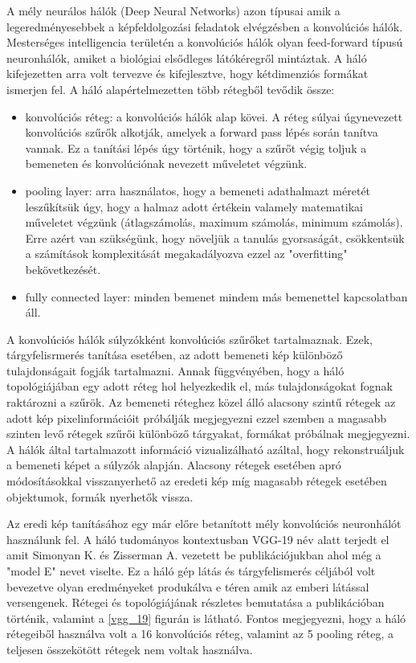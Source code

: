 \documentclass[12pt, a4paper, oneside]{book}
\theoremstyle{tetel}
\begin{document}
A mély neurálos hálók (Deep Neural Networks) azon típusai amik a legeredményesebbek a képfeldolgozási feladatok elvégzésben a konvolúciós hálók. Mesterséges intelligencia területén a konvolúciós hálók olyan feed-forward típusú neuronhálók, amiket a biológiai elsődleges látókéregről mintáztak. A háló kifejezetten arra volt tervezve és kifejlesztve, hogy kétdimenziós formákat ismerjen fel. A háló alapértelmezetten több rétegből tevődik össze:

\begin{itemize}
	\item konvolúciós réteg: a konvolúciós hálók alap kövei. A réteg súlyai úgynevezett konvolúciós szűrők alkotják, amelyek a forward pass lépés során tanítva vannak. Ez a tanítási lépés úgy történik, hogy a szűrőt végig toljuk a bemeneten és konvolúciónak nevezett műveletet végzünk. 
	\item pooling layer: arra használatos, hogy a bemeneti adathalmazt méretét leszűkítsük úgy, hogy a halmaz adott értékein valamely matematikai műveletet végzünk (átlagszámolás, maximum számolás, minimum számolás). Erre azért van szükségünk, hogy növeljük a tanulás gyorsaságát, csökkentsük a számítások komplexitását megakadályozva ezzel az "overfitting" bekövetkezését.
	\item fully connected layer: minden bemenet mindem más bemenettel kapcsolatban áll.
\end{itemize}

A konvolúciós hálók súlyzókként konvolúciós szűrőket tartalmaznak. Ezek, tárgyfelisrmerés tanítása esetében, az adott bemeneti kép különböző tulajdonságait fogják tartalmazni. Annak függvényében, hogy a háló topológiájában egy adott réteg hol helyezkedik el, más tulajdonságokat fognak raktározni a szűrök. Az bemeneti réteghez közel álló alacsony szintű rétegek az adott kép pixelinformációit próbálják megjegyezni ezzel szemben a magasabb szinten levő rétegek szűrői különböző tárgyakat, formákat próbálnak megjegyezni\cite{27}\cite{28}. A hálók által tartalmazott információ vizualizálható azáltal, hogy rekonstruáljuk a bemeneti képet a súlyzók alapján. Alacsony rétegek esetében apró módosításokkal visszanyerhető az eredeti kép míg magasabb rétegek esetében objektumok, formák nyerhetők vissza.

Az eredi kép tanításához egy már előre betanított mély konvolúciós neuronhálót használunk fel. A háló tudományos kontextusban VGG-19 név alatt terjedt el amit Simonyan K. és  Zisserman A. vezetett be publikációjukban\cite{29} ahol még a "model E" nevet viselte. Ez a háló gép látás és tárgyfelismerés céljából volt bevezetve olyan eredményeket produkálva e téren amik az emberi látással versengenek. Rétegei és topológiájának részletes bemutatása a \cite{29} publikációban történik, valamint a \ref{vgg_19} figurán is látható. Fontos megjegyezni, hogy a háló rétegeiből használva volt a 16 konvolúciós réteg, valamint az 5 pooling réteg, a teljesen összekötött rétegek nem voltak használva.
\end{document}
